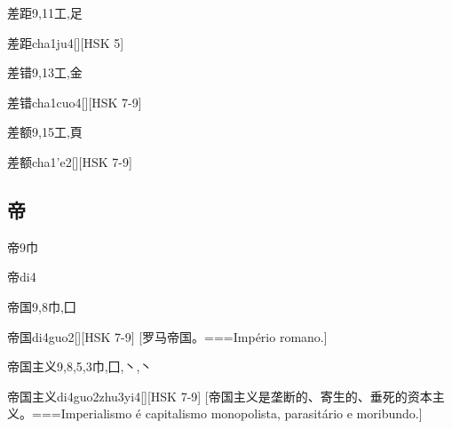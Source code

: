\begin{Entry}{差距}{9,11}{⼯,⾜}
  \begin{Phonetics}{差距}{cha1ju4}[][HSK 5]
  \end{Phonetics}
\end{Entry}

\begin{Entry}{差错}{9,13}{⼯,⾦}
  \begin{Phonetics}{差错}{cha1cuo4}[][HSK 7-9]
  \end{Phonetics}
\end{Entry}

\begin{Entry}{差额}{9,15}{⼯,⾴}
  \begin{Phonetics}{差额}{cha1'e2}[][HSK 7-9]
  \end{Phonetics}
\end{Entry}

\subsection*{帝}

\begin{Entry}{帝}{9}{⼱}
  \begin{Phonetics}{帝}{di4}
  \end{Phonetics}
\end{Entry}

\begin{Entry}{帝国}{9,8}{⼱,⼞}
  \begin{Phonetics}{帝国}{di4guo2}[][HSK 7-9]
    [罗马帝国。===Império romano.]
  \end{Phonetics}
\end{Entry}

\begin{Entry}{帝国主义}{9,8,5,3}{⼱,⼞,⼂,⼂}
  \begin{Phonetics}{帝国主义}{di4guo2zhu3yi4}[][HSK 7-9]
    [帝国主义是垄断的、寄生的、垂死的资本主义。===Imperialismo é capitalismo monopolista, parasitário e moribundo.]
  \end{Phonetics}
\end{Entry}

